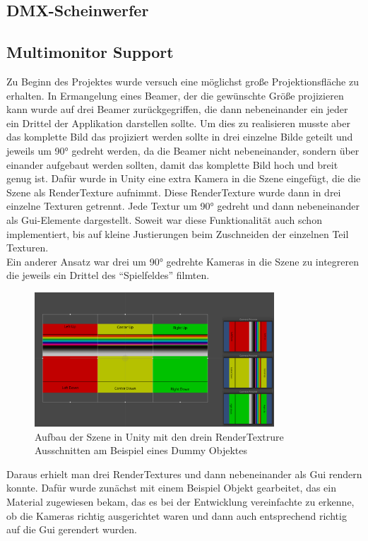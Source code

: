 \subsection{DMX-Scheinwerfer}
\newpage
\subsection{Multimonitor Support}
Zu Beginn des Projektes wurde versuch eine möglichst große Projektionsfläche zu erhalten. In Ermangelung eines Beamer, der die gewünschte Größe projizieren kann wurde auf drei Beamer zurückgegriffen, die dann nebeneinander ein jeder ein Drittel der Applikation darstellen sollte. Um dies zu realisieren musste aber das komplette Bild das projiziert werden sollte in drei einzelne Bilde geteilt und jeweils um 90° gedreht werden, da die Beamer nicht nebeneinander, sondern über einander aufgebaut werden sollten, damit das komplette Bild hoch und breit genug ist. Dafür wurde in Unity eine extra Kamera in die Szene eingefügt, die die Szene als RenderTexture aufnimmt. Diese RenderTexture wurde dann in drei einzelne Texturen getrennt. Jede Textur um 90° gedreht und dann nebeneinander als Gui-Elemente dargestellt. Soweit war diese Funktionalität auch schon implementiert, bis auf kleine Justierungen beim Zuschneiden der einzelnen Teil Texturen. \\
Ein anderer Ansatz war drei um 90° gedrehte Kameras in die Szene zu integreren die jeweils ein Drittel des "`Spielfeldes"' filmten. 
\begin{figure}[h]
	\centering
		\includegraphics[width=0.8\textwidth]{images/RenderTextureBeispielSzene.PNG}
	\caption{Aufbau der Szene in Unity mit den drein RenderTextrure Ausschnitten am Beispiel eines Dummy Objektes}
	\label{fig:RenderTextureBeispielSzene}
\end{figure}
Daraus erhielt man drei RenderTextures und dann nebeneinander als Gui rendern konnte. Dafür wurde zunächst mit einem Beispiel Objekt gearbeitet, das ein Material zugewiesen bekam, das es bei der Entwicklung vereinfachte zu erkenne, ob die Kameras richtig ausgerichtet waren und dann auch entsprechend richtig auf die Gui gerendert wurden. 
